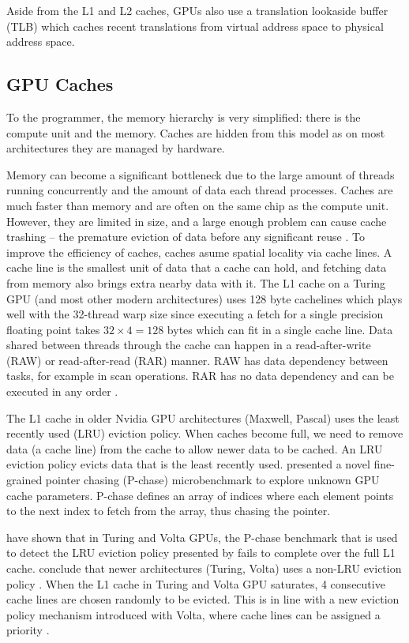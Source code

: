 Aside from the L1 and L2 caches, GPUs also use a translation lookaside buffer (TLB) which caches recent translations from virtual address space to physical address space.

\subsection{GPU Caches}
\label{sec:cache_gpu}
To the programmer, the memory hierarchy is very simplified: there is the compute unit and the memory.
Caches are hidden from this model as on most architectures they are managed by hardware.

Memory can become a significant bottleneck due to the large amount of threads running concurrently and the amount of data each thread processes.
Caches are much faster than memory and are often on the same chip as the compute unit.
However, they are limited in size, and a large enough problem can cause cache trashing -- the premature eviction of data before any significant reuse \cite{dai2016model}.
To improve the efficiency of caches, caches asume spatial locality via cache lines.
A cache line is the smallest unit of data that a cache can hold, and fetching data from memory also brings extra nearby data with it.
The L1 cache on a Turing GPU (and most other modern architectures) uses 128 byte cachelines which plays well with the 32-thread warp size since executing a fetch for a single precision floating point takes $32 \times 4 = 128$ bytes which can fit in a single cache line.
Data shared between threads through the cache can happen in a read-after-write (RAW) or read-after-read (RAR) manner.
RAW has data dependency between tasks, for example in scan operations.
RAR has no data dependency and can be executed in any order \cite{tripathy2021paver}.

The L1 cache in older Nvidia GPU architectures (Maxwell, Pascal) uses the least recently used (LRU) eviction policy.
When caches become full, we need to remove data (a cache line) from the cache to allow newer data to be cached.
An LRU eviction policy evicts data that is the least recently used.
\citet{mei2016dissecting} presented a novel fine-grained pointer chasing (P-chase) microbenchmark to explore unknown GPU cache parameters.
P-chase defines an array of indices where each element points to the next index to fetch from the array, thus chasing the pointer.

\citet{jia2019dissecting} have shown that in Turing and Volta GPUs, the P-chase benchmark that is used to detect the LRU eviction policy presented by \citet{mei2016dissecting} fails to complete over the full L1 cache.
\citeauthor{jia2019dissecting} conclude that newer architectures (Turing, Volta) uses a non-LRU eviction policy \cite{jia2019dissecting, jia2018dissecting,mei2016dissecting}.
When the L1 cache in Turing and Volta GPU saturates, 4 consecutive cache lines are chosen randomly to be evicted.
This is in line with a new eviction policy mechanism introduced with Volta, where cache lines can be assigned a priority \cite{jia2019dissecting,nvidia2021cudadocs}.

